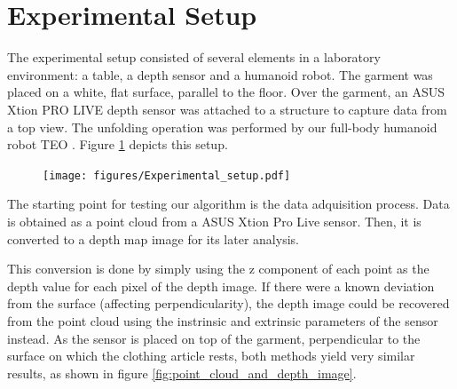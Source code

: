 \section{Experimental Setup}
\label{experiments:expermimental_setup}

The experimental setup consisted of several elements in a laboratory environment: a table, a depth sensor and a humanoid robot. The garment was placed on a white, flat surface, parallel to the floor. Over the garment, an ASUS Xtion PRO LIVE depth sensor was attached to a structure to capture data from a top view. The unfolding operation was performed by our full-body humanoid robot TEO \cite{martinez2012teo}. Figure \ref{fig:experimental_setup} depicts this setup.

\begin{figure}[t]
    \centering
    \texttt{[image: figures/Experimental\_setup.pdf]}
    \caption{}
    \label{fig:experimental_setup}
\end{figure}

The starting point for testing our algorithm is the data adquisition process. Data is obtained as a point cloud from a ASUS Xtion Pro Live sensor. Then, it is converted to a depth map image for its later analysis. 

This conversion is done by simply using the z component of each point as the depth value for each pixel of the depth image. If there were a known deviation from the surface (affecting perpendicularity), the depth image could be recovered from the point cloud using the instrinsic and extrinsic parameters of the sensor instead. As the sensor is placed on top of the garment, perpendicular to the surface on which the clothing article rests, both methods yield very similar results, as shown in figure \ref{fig:point_cloud_and_depth_image}.


